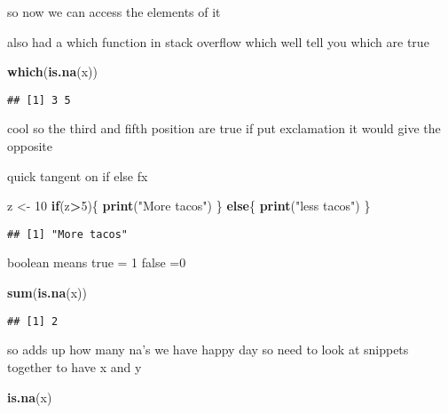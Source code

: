 \documentclass[]{article}
\newenvironment{Shaded}{\begin{snugshade}}{\end{snugshade}}
\newcommand{\KeywordTok}[1]{\textcolor[rgb]{0.13,0.29,0.53}{\textbf{#1}}}
\newcommand{\DecValTok}[1]{\textcolor[rgb]{0.00,0.00,0.81}{#1}}
\newcommand{\StringTok}[1]{\textcolor[rgb]{0.31,0.60,0.02}{#1}}
\newcommand{\ControlFlowTok}[1]{\textcolor[rgb]{0.13,0.29,0.53}{\textbf{#1}}}
\newcommand{\OperatorTok}[1]{\textcolor[rgb]{0.81,0.36,0.00}{\textbf{#1}}}
\newcommand{\NormalTok}[1]{#1}
\begin{document}
so now we can access the elements of it

also had a which function in stack overflow which well tell you which
are true

\begin{Shaded}
\begin{Highlighting}[]
\KeywordTok{which}\NormalTok{(}\KeywordTok{is.na}\NormalTok{(x))}
\end{Highlighting}
\end{Shaded}

\begin{verbatim}
## [1] 3 5
\end{verbatim}

cool so the third and fifth position are true if put exclamation it
would give the opposite

quick tangent on if else fx

\begin{Shaded}
\begin{Highlighting}[]
\NormalTok{z <-}\StringTok{ }\DecValTok{10}
\ControlFlowTok{if}\NormalTok{(z}\OperatorTok{>}\DecValTok{5}\NormalTok{)\{}
  \KeywordTok{print}\NormalTok{(}\StringTok{"More tacos"}\NormalTok{)}
\NormalTok{\} }\ControlFlowTok{else}\NormalTok{\{}
  \KeywordTok{print}\NormalTok{(}\StringTok{"less tacos"}\NormalTok{)}
\NormalTok{\}}
\end{Highlighting}
\end{Shaded}

\begin{verbatim}
## [1] "More tacos"
\end{verbatim}

boolean means true = 1 false =0

\begin{Shaded}
\begin{Highlighting}[]
\KeywordTok{sum}\NormalTok{(}\KeywordTok{is.na}\NormalTok{(x))}
\end{Highlighting}
\end{Shaded}

\begin{verbatim}
## [1] 2
\end{verbatim}

so adds up how many na's we have happy day so need to look at snippets
together to have x and y

\begin{Shaded}
\begin{Highlighting}[]
\KeywordTok{is.na}\NormalTok{(x)}
\end{Highlighting}
\end{Shaded}
\end{document}
